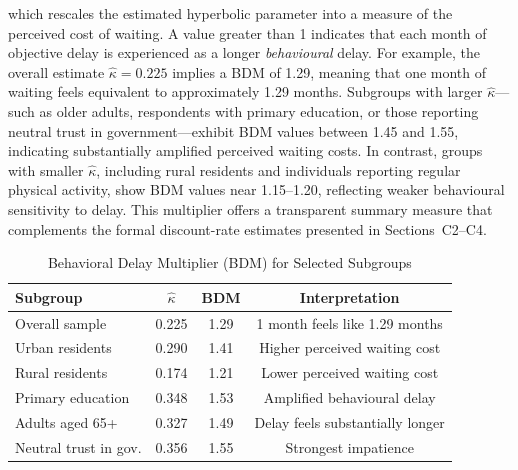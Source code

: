 which rescales the estimated hyperbolic parameter into a measure of the perceived cost of
waiting. A value greater than 1 indicates that each month of objective delay is experienced as
a longer \emph{behavioural} delay. For example, the overall estimate $\hat{\kappa} = 0.225$
implies a BDM of 1.29, meaning that one month of waiting feels equivalent to approximately
1.29 months. Subgroups with larger $\hat{\kappa}$—such as older adults, respondents with
primary education, or those reporting neutral trust in government—exhibit BDM values
between 1.45 and 1.55, indicating substantially amplified perceived waiting costs. In contrast,
groups with smaller $\hat{\kappa}$, including rural residents and individuals reporting regular
physical activity, show BDM values near 1.15–1.20, reflecting weaker behavioural sensitivity
to delay. This multiplier offers a transparent summary measure that complements the formal
discount-rate estimates presented in Sections~C2–C4.

\begin{table}[H]
\centering
\caption{Behavioral Delay Multiplier (BDM) for Selected Subgroups}
\label{tab:BDM}
\begin{tabular}{lccc}
\toprule
\textbf{Subgroup} & $\hat{\kappa}$ & \textbf{BDM} & \textbf{Interpretation} \\
\midrule
Overall sample          & 0.225 & 1.29 & 1 month feels like 1.29 months \\
Urban residents         & 0.290 & 1.41 & Higher perceived waiting cost \\
Rural residents         & 0.174 & 1.21 & Lower perceived waiting cost \\
Primary education       & 0.348 & 1.53 & Amplified behavioural delay \\
Adults aged 65+         & 0.327 & 1.49 & Delay feels substantially longer \\
Neutral trust in gov.   & 0.356 & 1.55 & Strongest impatience \\
\bottomrule
\end{tabular}
\end{table}


